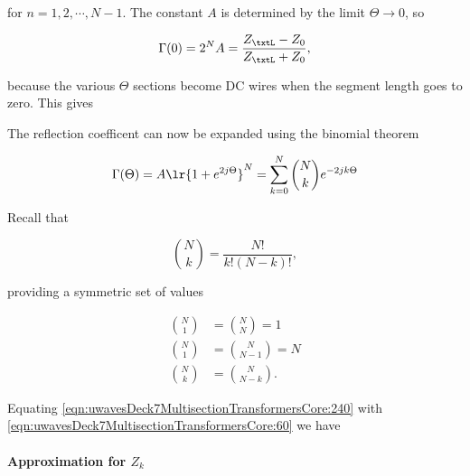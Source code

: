 for \( n = 1, 2, \cdots, N-1 \).  The constant \( A \) is determined by the limit \( \Theta \rightarrow 0 \), so

\begin{equation}\label{eqn:uwavesDeck7MultisectionTransformersCore:200}
\Gamma(0) = 2^N A = \frac{Z_\txtL - Z_0}{Z_\txtL + Z_0}, 
\end{equation}

because the various \( \Theta \) sections become DC wires when the segment length goes to zero.  This gives


The reflection coefficent can now be expanded using the binomial theorem

\begin{dmath}\label{eqn:uwavesDeck7MultisectionTransformersCore:240}
\Gamma(\Theta) 
= A \lr{ 1 + e^{ 2 j \Theta } }^N
= \sum_{k = 0}^N \binom{N}{k} e^{ -2 j k \Theta}
\end{dmath}

Recall that 

\begin{equation}\label{eqn:uwavesDeck7MultisectionTransformersCore:260}
\binom{N}{k} = \frac{N!}{k! (N-k)!},
\end{equation}

providing a symmetric set of values

\begin{equation}\label{eqn:uwavesDeck7MultisectionTransformersCore:280}
\begin{aligned}
\binom{N}{1} &= \binom{N}{N} = 1 \\
\binom{N}{1} &= \binom{N}{N-1} = N \\
\binom{N}{k} &= \binom{N}{N-k}.
\end{aligned}
\end{equation}

Equating \cref{eqn:uwavesDeck7MultisectionTransformersCore:240} with \cref{eqn:uwavesDeck7MultisectionTransformersCore:60} we have


\paragraph{Approximation for \( Z_k \)}

